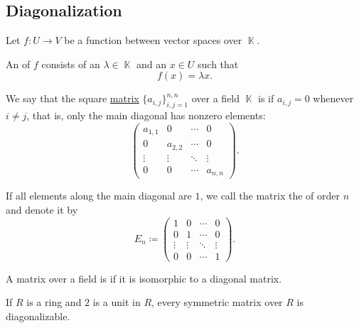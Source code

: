 \subsection{Diagonalization}\label{subsec:diagonalization}

\begin{definition}\label{def:eigenpair}
  Let \( f: U \to V \) be a function between vector spaces over \( \BbbK \).

  An  of \( f \) consists of an  \( \lambda \in \BbbK \) and an  \( x \in U \) such that
  \begin{equation*}
    f(x) = \lambda x.
  \end{equation*}
\end{definition}

\begin{definition}\label{def:matrix_diagonal}
  We say that the square \hyperref[def:array/matrix]{matrix} \( \{ a_{i,j} \}_{i,j=1}^{n,n} \) over a field \( \BbbK \) is  if \( a_{i,j} = 0 \) whenever \( i \neq j \), that is, only the main diagonal has nonzero elements:
  \begin{equation*}
    \begin{pmatrix}
      a_{1,1} & 0       & \cdots & 0       \\
      0       & a_{2,2} & \cdots & 0       \\
      \vdots  & \vdots  & \ddots & \vdots  \\
      0       & 0       & \cdots & a_{n,n}
    \end{pmatrix}.
  \end{equation*}

  If all elements along the main diagonal are \( 1 \), we call the matrix the  of order \( n \) and denote it by
  \begin{equation*}
    E_n \coloneqq
    \begin{pmatrix}
      1      & 0      & \cdots & 0      \\
      0      & 1      & \cdots & 0      \\
      \vdots & \vdots & \ddots & \vdots \\
      0      & 0      & \cdots & 1
    \end{pmatrix}.
  \end{equation*}
\end{definition}

\begin{definition}\label{def:diagonalizable_matrix}
  A matrix over a field is  if it is isomorphic to a diagonal matrix.
\end{definition}

\begin{theorem}\label{def:spectral_theorem_for_matrices}
  If \( R \) is a ring and \( 2 \) is a unit in \( R \), every symmetric matrix over \( R \) is diagonalizable.
\end{theorem}
